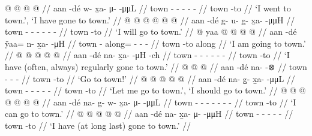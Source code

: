 \documentclass[12pt,letterpaper,oneside,article]{memoir}
\begin{document}
\pex\label{ex:motpos-motasp}%
\a\label{ex:motpos-motasp-pfv}%
%
\begingl
	\gla	{} @ {}  @ {} @ {} @ {} //
	\glb	aan -dé w- x̱a- μ-  -μμL //
	\glc	town - - - -  - //
	\gld	town -to  {} {} {} //
	\glft	‘I went to town.’, ‘I have gone to town.’
		//
\endgl
\a\label{ex:motpos-motasp-prosp}%
%
\begingl
	\gla	{} @ {}  @ {} @ {} @ {} @ {} @ {} //
	\glb	aan -dé g- u- g̱- x̱a-  -μμH //
	\glc	town - - - - -  - //
	\gld	town -to  {} {} {} {} {} //
	\glft	‘I will go to town.’
		//
\endgl
\a\label{ex:motpos-motasp-prog}%
%
\begingl
	\gla	{} @ {} yaa @  @ {} @ {} @ {} //
	\glb	aan -dé ÿaa= n- x̱a-  -μH //
	\glc	town - along= - -  - //
	\gld	town -to along  {} {} {} //
	\glft	‘I am going to town.’
		//
\endgl
\a\label{ex:motpos-motasp-hab}%
%
\begingl
	\gla	{} @ {}  @ {} @ {} @ {} @ {} //
	\glb	aan -dé na- x̱a-  -μH -ch //
	\glc	town - - - -  - - //
	\gld	town -to  {} {} {} {} //
	\glft	‘I have (often, always) regularly gone to town.’
		//
\endgl
\a\label{ex:motpos-motasp-imp}%
%
\begingl
	\gla	{} @ {}  @ {} @ {} //
	\glb	aan -dé na-  -⊗ //
	\glc	town - -  - //
	\gld	town -to  {} {} //
	\glft	‘Go to town!’
		//
\endgl
\a\label{ex:motpos-motasp-hort}%
%
\begingl
	\gla	{} @ {}  @ {} @ {} @ {} @ {} //
	\glb	aan -dé na- g̱- x̱a-  -μμL //
	\glc	town - - - -  - //
	\gld	town -to  {} {} {} {} //
	\glft	‘Let me go to town.’, ‘I should go to town.’
		//
\endgl
\a\label{ex:motpos-motasp-pot}%
%
\begingl
	\gla	{} @ {}  @ {} @ {} @ {} @ {} @ {} @ {} //
	\glb	aan -dé na- g̱- w- x̱a- μ-  -μμL //
	\glc	town - - - - - -  - //
	\gld	town -to  {} {} {} {} {} {} //
	\glft	‘I can go to town.’
		//
\endgl
\a\label{ex:motpos-motasp-rlzn}%
%
\begingl
	\gla	{} @ {}  @ {} @ {} @ {} @ {} //
	\glb	aan -dé na- x̱a- μ-  -μμH //
	\glc	town - - - -  - //
	\gld	town -to  {} {} {} {} //
	\glft	‘I have (at long last) gone to town.’
		//
\endgl
\xe
\end{document}
